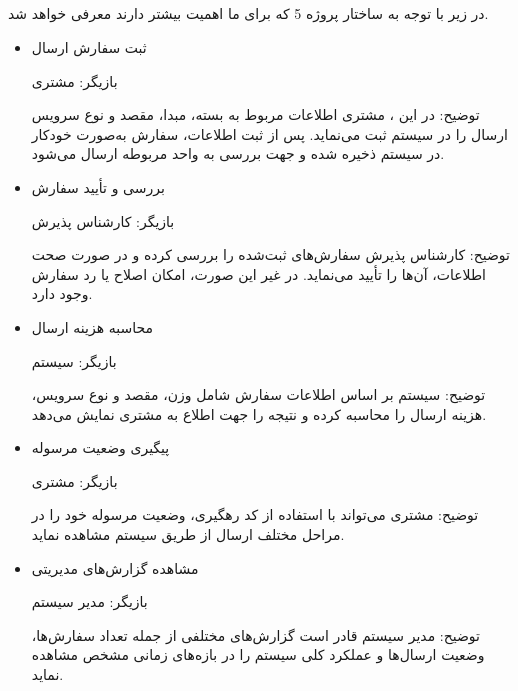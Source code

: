 \documentclass[12pt,a4paper]{report}
\begin{document}
\subsection{}
در زیر با توجه به ساختار پروژه 5  که برای ما اهمیت بیشتر دارند معرفی خواهد شد.
\begin{itemize}
	\item 
ثبت سفارش ارسال

بازیگر: مشتری

توضیح:
در این ، مشتری اطلاعات مربوط به بسته، مبدا، مقصد و نوع سرویس ارسال را در سیستم ثبت می‌نماید. پس از ثبت اطلاعات، سفارش به‌صورت خودکار در سیستم ذخیره شده و جهت بررسی به واحد مربوطه ارسال می‌شود.
\item 
بررسی و تأیید سفارش

بازیگر: کارشناس پذیرش

توضیح:
کارشناس پذیرش سفارش‌های ثبت‌شده را بررسی کرده و در صورت صحت اطلاعات، آن‌ها را تأیید می‌نماید. در غیر این صورت، امکان اصلاح یا رد سفارش وجود دارد.
\item
محاسبه هزینه ارسال

بازیگر: سیستم

توضیح:
سیستم بر اساس اطلاعات سفارش شامل وزن، مقصد و نوع سرویس، هزینه ارسال را محاسبه کرده و نتیجه را جهت اطلاع به مشتری نمایش می‌دهد.
\item
پیگیری وضعیت مرسوله

بازیگر: مشتری

توضیح:
مشتری می‌تواند با استفاده از کد رهگیری، وضعیت مرسوله خود را در مراحل مختلف ارسال از طریق سیستم مشاهده نماید.
\item 
مشاهده گزارش‌های مدیریتی

بازیگر: مدیر سیستم

توضیح:
مدیر سیستم قادر است گزارش‌های مختلفی از جمله تعداد سفارش‌ها، وضعیت ارسال‌ها و عملکرد کلی سیستم را در بازه‌های زمانی مشخص مشاهده نماید.
\end{itemize}
\newpage
\end{document}
